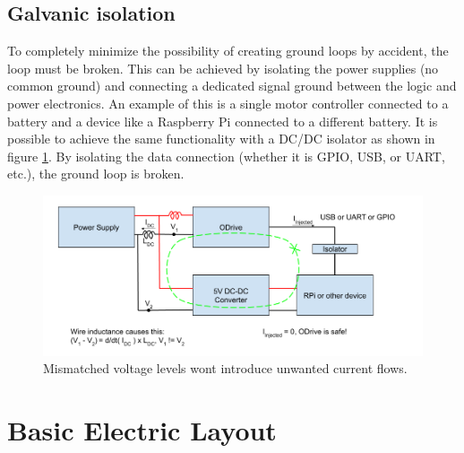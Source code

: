     \subsection{Galvanic isolation}
    
    To completely minimize the possibility of creating ground loops by accident, the loop must be broken. This can be achieved by isolating the power supplies (no common ground) and connecting a dedicated signal ground between the logic and power electronics. An example of this is a single motor controller connected to a battery and a device like a Raspberry Pi connected to a different battery. It is possible to achieve the same functionality with a DC/DC isolator as shown in figure \ref{ground_loop_fix}. By isolating the data connection (whether it is GPIO, USB, or UART, etc.), the ground loop is broken.
    
    \begin{figure}[h] %
        \includegraphics[width=\textwidth]{contents/figures/ground_loop_fix.png}
        \caption{Mismatched voltage levels wont introduce unwanted current flows.}
        \label{ground_loop_fix}
    \end{figure}

    \clearpage %
    
\section{Basic Electric Layout}


